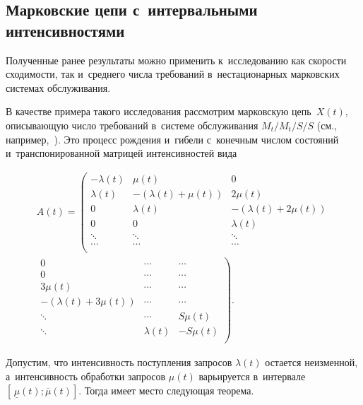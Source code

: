 \begin{multicols}{2}
\section{Марковские цепи с~интервальными интенсивностями}


Полученные ранее результаты можно применить к~исследованию как скорости 
сходимости, так и~среднего числа требований в~нестационарных марковских системах 
обслуживания.

В качестве примера такого исследования рассмотрим марковскую цепь~$X(t)$, 
опи\-сы\-ва\-ющую чис\-ло требований в~системе обслуживания  $M_t/M_t/S/S$ (см., 
например,~\cite{Doorn2009}). Это процесс рож\-де\-ния и~гибели с~конечным чис\-лом 
со\-сто\-яний и~транспонированной мат\-ри\-цей интенсивностей вида

\noindent
\begin{multline*}
A(t)=\left(
\begin{array}{ccc}
-\lambda(t)  & \mu(t)              & 0  \\
 \lambda(t)  &-(\lambda(t)+\mu(t)) & 2\mu(t)  \\
  0          &\lambda(t)           & -\left(\lambda(t)+2\mu(t)\right) \\
    0          & 0                   & \lambda(t)         \\
 \ddots      & \ddots              & \ddots   \\
 \cdots      & \cdots              & \cdots  \\
\end{array}
\right.\\
\left.
\begin{array}{ccc}
 0                                   & \cdots & \cdots  \\
 0                                  & \cdots  & \cdots \\
3\mu(t)                            & \cdots   & \cdots\\
 -\left(\lambda(t)+3\mu(t)\right) & \cdots  & \cdots\\
\ddots                             & \cdots  & S\mu(t)\\
\ddots                             & \lambda(t) & -S\mu(t)\\
\end{array}
\right).
\end{multline*}

\vspace*{-3pt}

Допустим, что интенсивность поступления запросов $\lambda(t)$ остается 
неизменной,  а~интенсивность обработки запросов $\mu(t)$  варьируется 
в~интервале $\left[\,\underline\mu(t); \overline\mu(t)\right]$. Тогда имеет место 
следующая теорема.


\end{multicols}
